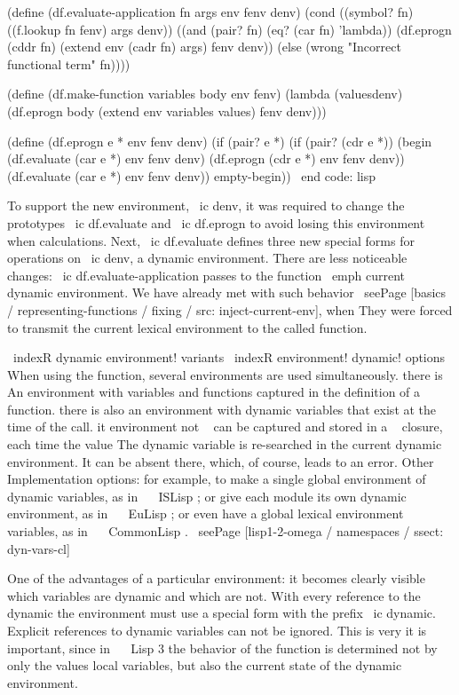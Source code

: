 (define (df.evaluate-application fn args env fenv denv)
  (cond ((symbol? fn) ((f.lookup fn fenv) args denv))
        ((and (pair? fn) (eq? (car fn) 'lambda))
         (df.eprogn (cddr fn)
                    (extend env (cadr fn) args)
                    fenv
                    denv))
        (else (wrong "Incorrect functional term" fn))))

(define (df.make-function variables body env fenv)
  (lambda (values ​​denv)
    (df.eprogn body (extend env variables values) fenv denv)))

(define (df.eprogn e * env fenv denv)
  (if (pair? e *)
      (if (pair? (cdr e *))
          (begin (df.evaluate (car e *) env fenv denv)
                 (df.eprogn (cdr e *) env fenv denv))
          (df.evaluate (car e *) env fenv denv))
      empty-begin))
\ end {code: lisp}

To support the new environment, \ ic {denv}, it was required to change the prototypes
\ ic {df.evaluate} and \ ic {df.eprogn} to avoid losing this environment when
calculations. Next, \ ic {df.evaluate} defines three new special forms
for operations on \ ic {denv}, a dynamic environment. There are less noticeable
changes: \ ic {df.evaluate-application} passes to the function \ emph {current}
dynamic environment. We have already met with such behavior
\ seePage [basics / representing-functions / fixing / src: inject-current-env], when
They were forced to transmit the current lexical environment to the called function.

\ indexR {dynamic environment! variants}
\ indexR {environment! dynamic! options}
When using the function, several environments are used simultaneously. there is
An environment with variables and functions captured in the definition of a function. there is
also an environment with dynamic variables that exist at the time of the call. it
environment not ~ can be captured and stored in a ~ closure, each time the value
The dynamic variable is re-searched in the current dynamic environment. It
can be absent there, which, of course, leads to an error. Other
Implementation options: for example, to make a single global environment of dynamic
variables, as in ~ { \ ISLisp }; or give each module its own dynamic
environment, as in ~ { \ EuLisp }; or even have a global lexical environment
variables, as in ~ { \ CommonLisp }.
\ seePage [lisp1-2-omega / namespaces / ssect: dyn-vars-cl]

One of the advantages of a particular environment: it becomes clearly visible which
variables are dynamic and which are not. With every reference to the dynamic
the environment must use a special form with the prefix \ ic {dynamic}.
Explicit references to dynamic variables can not be ignored. This is very
it is important, since in ~ \ Lisp 3 the behavior of the function is determined not by only the values
local variables, but also the current state of the dynamic environment.

